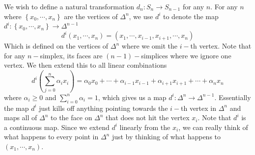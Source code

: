 \documentclass[12pt,reqno]{amsart}
\numberwithin{theorem}{section}
\theoremstyle{definition}
\theoremstyle{remark}
\numberwithin{equation}{section}
\newcommand{\set}[1]{\left \{ #1 \right \}}
\theoremstyle{definition}
\begin{document}
We wish to define a natural transformation $d_n:S_n\rightarrow S_{n-1}$ for any $n$. For any $n$ where $\set{x_0,\cdots,x_n}$ are the vertices of $\Delta^n$, we use $d^i$ to denote the map $d^i:\set{x_0,\cdots,x_n}\rightarrow \Delta^{n-1}$
$$d^i(x_1,\cdots,x_n) = (x_1,\cdots,x_{i-1},x_{i+1},\cdots,x_n)$$
Which is defined on the vertices of $\Delta^n$ where we omit the $i-$th vertex. Note that for any $n-$simplex, its faces are $(n-1)-$simplices where we ignore one vertex. We then extend this to all linear combinations $$d^i\left (\displaystyle \sum_{j=0}^n\alpha_i x_i \right ) = \alpha_0x_0 + \cdots + \alpha_{i-1}x_{i-1}+\alpha_{i+1}x_{i+1}+\cdots+\alpha_nx_n$$
where $\alpha_i \geq 0$ and $\sum_{i=0}^n \alpha_i = 1$, which gives us a map $d^i: \Delta^n \rightarrow \Delta^{n-1}$. Essentially the map $d^i$ just kills off anything pointing towards the $i-$th vertex in $\Delta^n$ and maps all of $\Delta^n$ to the face on $\Delta^n$ that does not hit the vertex $x_i$. Note that $d^i$ is a continuous map. Since we extend $d^i$ linearly from the $x_i$, we can really think of what happens to every point in $\Delta^n$ just by thinking of what happens to $(x_1,\cdots,x_n)$.
\end{document}
